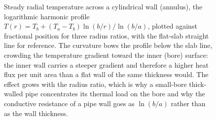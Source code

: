 \begin{figure}[htbp]
\centering
{}
\caption[Radial temperature in an annulus]{Steady radial temperature
across a cylindrical wall (annulus), the logarithmic harmonic profile
$T(r) = T_b + (T_a - T_b)\ln(b/r)/\ln(b/a)$, plotted against fractional
position for three radius ratios, with the flat-slab straight line
for reference. The curvature bows the profile below the slab line,
crowding the temperature gradient toward the inner (bore) surface: the
inner wall carries a steeper gradient and therefore a higher heat
flux per unit area than a flat wall of the same thickness would. The
effect grows with the radius ratio, which is why a small-bore
thick-walled pipe concentrates its thermal load on the bore and why
the conductive resistance of a pipe wall goes as $\ln(b/a)$ rather
than as the wall thickness.}
\label{fig:vol02:ch12:annulus}
\end{figure}
